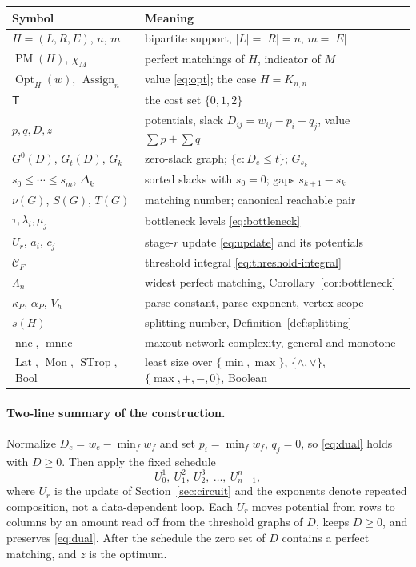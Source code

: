 \documentclass[11pt]{article}
\newcommand{\Assign}{\operatorname{Assign}}
\newcommand{\Opt}{\operatorname{Opt}}
\newcommand{\PM}{\operatorname{PM}}
\newcommand{\nnc}{\operatorname{nnc}}
\newcommand{\mnnc}{\operatorname{mnnc}}
\begin{document}
\begin{center}
\begin{tabular}{@{}ll@{}}
\toprule
Symbol & Meaning \\
\midrule
$H=(L,R,E)$, $n$, $m$ & bipartite support, $|L|=|R|=n$, $m=|E|$ \\
$\PM(H)$, $\chi_M$ & perfect matchings of $H$, indicator of $M$ \\
$\Opt_H(w)$, $\Assign_n$ & value \eqref{eq:opt}; the case $H=K_{n,n}$ \\
$\mathsf T$ & the cost set $\{0,1,2\}$ \\
$p,q,D,z$ & potentials, slack $D_{ij}=w_{ij}-p_i-q_j$, value $\sum p+\sum q$ \\
$G^{0}(D)$, $G_t(D)$, $G_k$ & zero-slack graph; $\{e:D_e\le t\}$; $G_{s_k}$ \\
$s_0\le\cdots\le s_m$, $\Delta_k$ & sorted slacks with $s_0=0$; gaps $s_{k+1}-s_k$ \\
$\nu(G)$, $S(G)$, $T(G)$ & matching number; canonical reachable pair \\
$\tau,\lambda_i,\mu_j$ & bottleneck levels \eqref{eq:bottleneck} \\
$U_r$, $a_i$, $c_j$ & stage-$r$ update \eqref{eq:update} and its potentials \\
$\mathcal C_F$ & threshold integral \eqref{eq:threshold-integral} \\
$\Lambda_n$ & widest perfect matching, Corollary~\ref{cor:bottleneck} \\
$\kappa_P$, $\alpha_P$, $V_h$ & parse constant, parse exponent, vertex scope \\
$s(H)$ & splitting number, Definition~\ref{def:splitting} \\
$\nnc$, $\mnnc$ & maxout network complexity, general and monotone \\
$\operatorname{Lat}$, $\operatorname{Mon}$, $\operatorname{STrop}$, $\operatorname{Bool}$ & least size over $\{\min,\max\}$, $\{\wedge,\vee\}$, $\{\max,+,-,0\}$, Boolean \\
\bottomrule
\end{tabular}
\end{center}

\paragraph{Two-line summary of the construction.}
Normalize $D_e=w_e-\min_fw_f$ and set $p_i=\min_fw_f$, $q_j=0$, so
\eqref{eq:dual} holds with $D\ge0$.  Then apply the fixed schedule
\begin{equation}
  U_0^{1},\ U_1^{2},\ U_2^{3},\ \ldots,\ U_{n-1}^{n},
  \label{eq:schedule}
\end{equation}
where $U_r$ is the update of Section~\ref{sec:circuit} and the exponents denote
repeated composition, not a data-dependent loop.  Each $U_r$ moves potential from
rows to columns by an amount read off from the threshold graphs of $D$, keeps
$D\ge0$, and preserves \eqref{eq:dual}.  After the schedule the zero set of $D$
contains a perfect matching, and $z$ is the optimum.
\end{document}
